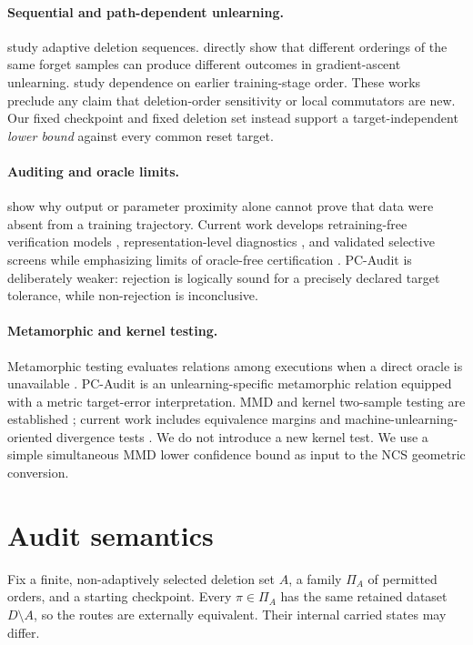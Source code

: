 \documentclass[10pt]{article}
\theoremstyle{definition}
\theoremstyle{remark}
\begin{document}
\paragraph{Sequential and path-dependent unlearning.}
\citet{gupta2021} study adaptive deletion sequences.
\citet{kumar2026} directly show that different orderings of the same forget
samples can produce different outcomes in gradient-ascent unlearning.
\citet{yu2025} study dependence on earlier training-stage order. These works
preclude any claim that deletion-order sensitivity or local commutators are
new. Our fixed checkpoint and fixed deletion set instead support a
target-independent \emph{lower bound} against every common reset target.

\paragraph{Auditing and oracle limits.}
\citet{thudi2022} show why output or parameter proximity alone cannot prove
that data were absent from a training trajectory. Current work develops
retraining-free verification models \citep{ye2026}, representation-level
diagnostics \citep{cosma2026}, and validated selective screens while emphasizing
limits of oracle-free certification \citep{yang2026}. PC-Audit is deliberately
weaker: rejection is logically sound for a precisely declared target
tolerance, while non-rejection is inconclusive.

\paragraph{Metamorphic and kernel testing.}
Metamorphic testing evaluates relations among executions when a direct oracle
is unavailable \citep{segura2016}. PC-Audit is an unlearning-specific
metamorphic relation equipped with a metric target-error interpretation.
MMD and kernel two-sample testing are established
\citep{gretton2012}; current work includes equivalence margins
\citep{liu2026} and machine-unlearning-oriented divergence tests
\citep{ribero2026}. We do not introduce a new kernel test. We use a simple
simultaneous MMD lower confidence bound as input to the NCS geometric
conversion.

\section{Audit semantics}

Fix a finite, non-adaptively selected deletion set \(A\), a family
\(\Pi_A\) of permitted orders, and a starting checkpoint. Every
\(\pi\in\Pi_A\) has the same retained dataset \(D\setminus A\), so the routes
are externally equivalent. Their internal carried states may differ.
\end{document}
